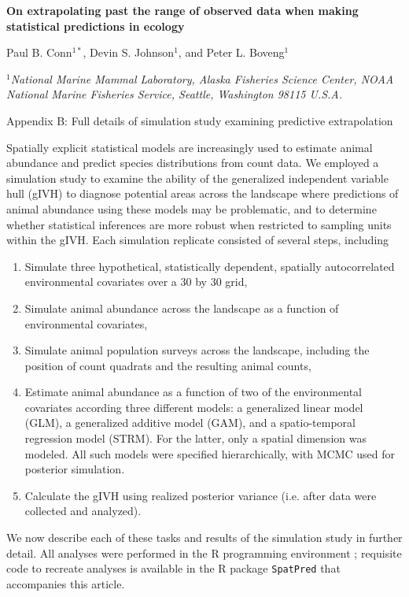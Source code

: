 \documentclass[12pt,fleqn]{article}
\begin{document}
\begin{center} \bf {\large On extrapolating past the range of observed data when making statistical predictions in ecology}

\vspace{0.7cm}
Paul B. Conn$^{1*}$, Devin S. Johnson$^1$, and Peter L. Boveng$^1$
\end{center}
\vspace{0.5cm}

\rm
\small

\it $^1$National Marine Mammal Laboratory, Alaska Fisheries Science Center,
NOAA National Marine Fisheries Service,
Seattle, Washington 98115 U.S.A.\\

\rm \begin{flushleft}

\raggedbottom
\vspace{.5in}

\begin{center}
Appendix B: Full details of simulation study examining predictive extrapolation
\bigskip
\end{center}
\vspace{.3in}

\doublespacing

Spatially explicit statistical models are increasingly used to estimate animal abundance and predict species distributions from count data.  We employed a simulation study to examine the ability of the generalized independent variable hull (gIVH) to diagnose potential areas across the landscape where predictions of animal abundance using these models may be problematic, and to determine whether statistical inferences are more robust when restricted to sampling units within the gIVH.  Each simulation replicate consisted of several steps, including
\begin{enumerate}
  \item Simulate three hypothetical, statistically dependent, spatially autocorrelated environmental covariates over a 30 by 30 grid,
  \item Simulate animal abundance across the landscape as a function of environmental covariates,
  \item Simulate animal population surveys across the landscape, including the position of count quadrats and the resulting animal counts,
  \item Estimate animal abundance as a function of two of the environmental covariates according three different models: a generalized linear model (GLM), a generalized additive model (GAM), and a spatio-temporal regression model (STRM).  For the latter, only a spatial dimension was modeled.  All such models were specified hierarchically, with MCMC used for posterior simulation.
  \item Calculate the gIVH using realized posterior variance (i.e. after data were collected and analyzed).
\end{enumerate}
We now describe each of these tasks and results of the simulation study in further detail.  All analyses were performed in the R programming environment \citep{RTeam2012}; requisite code to recreate analyses is available in the R package \texttt{SpatPred} that accompanies this article.


\end{flushleft}
\end{document}

